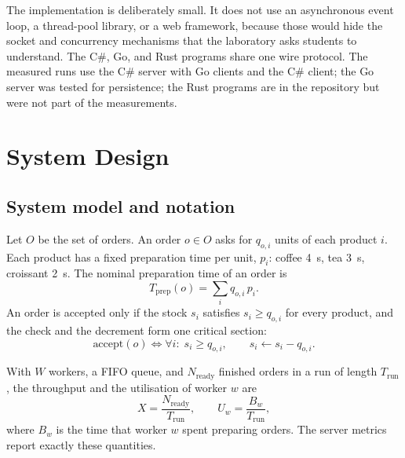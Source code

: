 \documentclass[12pt,a4paper]{article}
\begin{document}
The implementation is deliberately small. It does not use an asynchronous event
loop, a thread-pool library, or a web framework, because those would hide the
socket and concurrency mechanisms that the laboratory asks students to understand.
The C\#, Go, and Rust programs share one wire protocol. The measured runs use the
C\# server with Go clients and the C\# client; the Go server was tested for
persistence; the Rust programs are in the repository but were not part of the
measurements.

\section{System Design}
\label{sec:design}

\subsection{System model and notation}

Let $O$ be the set of orders. An order $o\in O$ asks for $q_{o,i}$ units of each
product $i$. Each product has a fixed preparation time per unit, $p_i$: coffee
4~s, tea 3~s, croissant 2~s. The nominal preparation time of an order is
\begin{equation}
T_{\mathrm{prep}}(o) = \sum_{i} q_{o,i}\,p_i.
\label{eq:prep}
\end{equation}
An order is accepted only if the stock $s_i$ satisfies $s_i\ge q_{o,i}$ for every
product, and the check and the decrement form one critical section:
\begin{equation}
\text{accept}(o) \iff \forall i:\; s_i \ge q_{o,i},
\qquad
s_i \leftarrow s_i - q_{o,i}.
\label{eq:stock}
\end{equation}

With $W$ workers, a FIFO queue, and $N_{\mathrm{ready}}$ finished orders in a run
of length $T_{\mathrm{run}}$, the throughput and the utilisation of worker $w$ are
\begin{equation}
X = \frac{N_{\mathrm{ready}}}{T_{\mathrm{run}}},
\qquad
U_w = \frac{B_w}{T_{\mathrm{run}}},
\label{eq:throughput}
\end{equation}
where $B_w$ is the time that worker $w$ spent preparing orders. The server metrics
report exactly these quantities.
\end{document}
